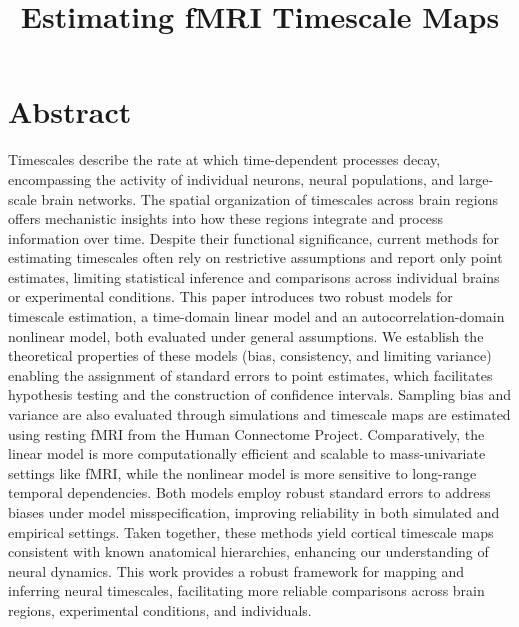 \documentclass[9pt]{article}
\title{Estimating fMRI Timescale Maps}
\date{}
\begin{document}
\maketitle

\section*{Abstract}
Timescales describe the rate at which time-dependent processes decay, encompassing the activity of individual neurons, neural populations, and large-scale brain networks. The spatial organization of timescales across brain regions offers mechanistic insights into how these regions integrate and process information over time. Despite their functional significance, current methods for estimating timescales often rely on restrictive assumptions and report only point estimates, limiting statistical inference and comparisons across individual brains or experimental conditions. This paper introduces two robust models for timescale estimation, a time-domain linear model and an autocorrelation-domain nonlinear model, both evaluated under general assumptions. We establish the theoretical properties of these models (bias, consistency, and limiting variance) enabling the assignment of standard errors to point estimates, which facilitates hypothesis testing and the construction of confidence intervals. Sampling bias and variance are also evaluated through simulations and timescale maps are estimated using resting fMRI from the Human Connectome Project. Comparatively, the linear model is more computationally efficient and scalable to mass-univariate settings like fMRI, while the nonlinear model is more sensitive to long-range temporal dependencies. Both models employ robust standard errors to address biases under model misspecification, improving reliability in both simulated and empirical settings. Taken together, these methods yield cortical timescale maps consistent with known anatomical hierarchies, enhancing our understanding of neural dynamics. This work provides a robust framework for mapping and inferring neural timescales, facilitating more reliable comparisons across brain regions, experimental conditions, and individuals.







\end{document}

